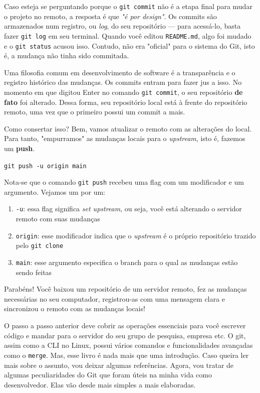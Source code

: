 \documentclass{article}
\begin{document}
  Caso esteja se perguntando porque o \texttt{git commit} não é a etapa final para mudar o projeto no remoto, a resposta é que 
  \textit{"é por design"}. Os commits são armazenados num registro, ou \textit{log}, do seu repositório --- para acessá-lo, basta fazer \texttt{git log} em seu terminal.
  Quando você editou \texttt{README.md}, algo foi mudado e o \texttt{git status} acusou isso. Contudo, não era "oficial" para o 
  sistema do Git, isto é, a mudança não tinha sido commitada. 
  
  Uma filosofia comum em desenvolvimento de software é a transparência e o registro histórico das mudanças. Os commits entram
  para fazer jus a isso. No momento em que digitou Enter no comando \texttt{git commit}, o seu repositório \textbf{de fato} foi alterado. 
  Dessa forma, seu repositório local está à frente do repositório remoto, uma vez que o primeiro possui um commit a mais. 

  Como consertar isso? Bem, vamos atualizar o remoto com as alterações do local. Para tanto, "empurramos" as mudanças locais 
  para o \textit{upstream}, isto é, fazemos um \textbf{push}.

  \vspace{1ex}
  \texttt{git push -u origin main}
  \vspace{1ex}

  Nota-se que o comando \texttt{git push} recebeu uma flag com um modificador e um argumento. Vejamos um por um: 

  \begin{enumerate}
	\item{\texttt{-u}: essa flag significa \textit{set upstream}, ou seja, você está alterando o servidor remoto com suas mudanças}
	\item{\texttt{origin}: esse modificador indica que o \textit{upstream} é o próprio repositório trazido pelo \texttt{git clone}}
	\item{\texttt{main}: esse argumento especifica o branch para o qual as mudanças estão sendo feitas}
  \end{enumerate}

  Parabéns! Você baixou um repositório de um servidor remoto, fez as mudanças necessárias no seu computador, registrou-as com uma
  mensagem clara e sincronizou o remoto com as mudanças locais!  


  O passo a passo anterior deve cobrir as operações essenciais para você escrever código e mandar para o servidor do seu grupo 
  de pesquisa, empresa etc. O git, assim como a CLI no Linux, possui vários comandos e funcionalidades avançadas como o \texttt{merge}.
  Mas, esse livro é nada mais que uma introdução. Caso queira ler mais sobre o assunto, vou deixar algumas referências. 
  Agora, vou tratar de algumas peculiaridades do Git que foram úteis na minha vida como desenvolvedor. Elas vão desde mais simples a 
  mais elaboradas. 
\end{document}
